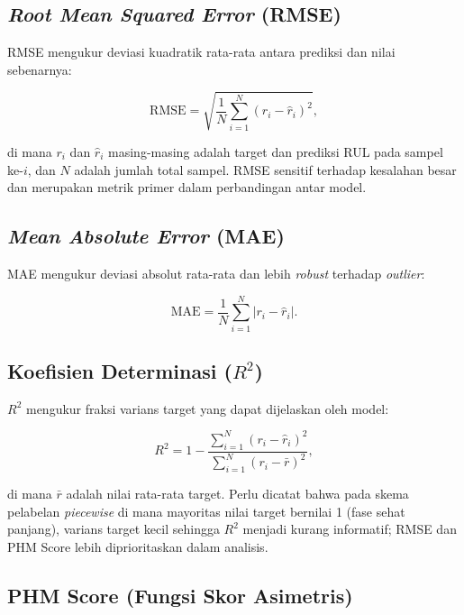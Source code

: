 \subsection{\emph{Root Mean Squared Error} (RMSE)}
\label{subsec:bab3_rmse}

RMSE mengukur deviasi kuadratik rata-rata antara prediksi dan nilai sebenarnya:

\begin{equation}\label{eq:bab3_rmse}
  \text{RMSE} = \sqrt{\frac{1}{N} \sum_{i=1}^{N} (r_i - \hat{r}_i)^2},
\end{equation}

\noindent di mana $r_i$ dan $\hat{r}_i$ masing-masing adalah target dan
prediksi RUL pada sampel ke-$i$, dan $N$ adalah jumlah total sampel.
RMSE sensitif terhadap kesalahan besar dan merupakan metrik primer dalam
perbandingan antar model.

\subsection{\emph{Mean Absolute Error} (MAE)}
\label{subsec:bab3_mae}

MAE mengukur deviasi absolut rata-rata dan lebih \emph{robust} terhadap
\emph{outlier}:

\begin{equation}\label{eq:bab3_mae}
  \text{MAE} = \frac{1}{N} \sum_{i=1}^{N} |r_i - \hat{r}_i|.
\end{equation}

\subsection{Koefisien Determinasi ($R^2$)}
\label{subsec:bab3_r2}

$R^2$ mengukur fraksi varians target yang dapat dijelaskan oleh model:

\begin{equation}\label{eq:bab3_r2}
  R^2 = 1 - \frac{\sum_{i=1}^{N} (r_i - \hat{r}_i)^2}{\sum_{i=1}^{N} (r_i - \bar{r})^2},
\end{equation}

\noindent di mana $\bar{r}$ adalah nilai rata-rata target. Perlu dicatat bahwa
pada skema pelabelan \emph{piecewise} di mana mayoritas nilai target bernilai 1
(fase sehat panjang), varians target kecil sehingga $R^2$ menjadi kurang
informatif; RMSE dan PHM Score lebih diprioritaskan dalam analisis.

\subsection{PHM Score (Fungsi Skor Asimetris)}
\label{subsec:bab3_phm_score}

